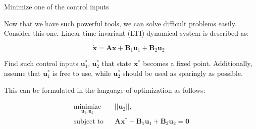 \documentclass{beamer}
\begin{document}
\begin{frame}{Minimize one of the control inputs}
\begin{flushleft}

Now that we have such powerful tools, we can solve difficult problems easily. Consider this one. Linear time-invariant (LTI) dynamical system is described as:

\begin{equation}
    \dot{\mathbf{x}} = \mathbf{A} \mathbf{x} + \mathbf{B}_1 \mathbf{u}_1 + \mathbf{B}_2 \mathbf{u}_2
\end{equation}

Find such control inputs $\mathbf{u}^*_1$, $\mathbf{u}^*_2$ that state $\mathbf{x}^*$ becomes a fixed point. Additionally, assume that $\mathbf{u}^*_1$ is free to use, while $\mathbf{u}^*_2$ should be used as sparingly as possible.

\bigskip

This can be formulated in the language of optimization as follows:

\begin{equation}
\begin{aligned}
& \underset{\mathbf{u}_1, \mathbf{u}_2}{\text{minimize}}
& & || \mathbf{u}_2 ||, \\
& \text{subject to}
& & \mathbf{A} \mathbf{x}^* + \mathbf{B}_1 \mathbf{u}_1 + \mathbf{B}_2 \mathbf{u}_2 = \mathbf{0}
\end{aligned}
\end{equation}

\end{flushleft}
\end{frame}
\end{document}
